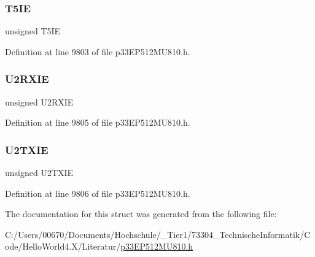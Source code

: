 \subsubsection{\texorpdfstring{T5\+IE}{T5IE}}
{\footnotesize\ttfamily unsigned T5\+IE}



Definition at line 9803 of file p33\+E\+P512\+M\+U810.\+h.

\mbox{\label{structtag_i_e_c1_b_i_t_s_ab399ed98ccb6f1df0efbdfbee0288970}} 
\subsubsection{\texorpdfstring{U2\+R\+X\+IE}{U2RXIE}}
{\footnotesize\ttfamily unsigned U2\+R\+X\+IE}



Definition at line 9805 of file p33\+E\+P512\+M\+U810.\+h.

\mbox{\label{structtag_i_e_c1_b_i_t_s_a32927ec0d2912392431d29e95328d35f}} 
\subsubsection{\texorpdfstring{U2\+T\+X\+IE}{U2TXIE}}
{\footnotesize\ttfamily unsigned U2\+T\+X\+IE}



Definition at line 9806 of file p33\+E\+P512\+M\+U810.\+h.



The documentation for this struct was generated from the following file\+:\begin{DoxyCompactItemize}
\item 
C\+:/\+Users/00670/\+Documents/\+Hochschule/\+\_\+\+Tier1/73304\+\_\+\+Technische\+Informatik/\+Code/\+Hello\+World4.\+X/\+Literatur/\hyperlink{p33_e_p512_m_u810_8h}{p33\+E\+P512\+M\+U810.\+h}\end{DoxyCompactItemize}
